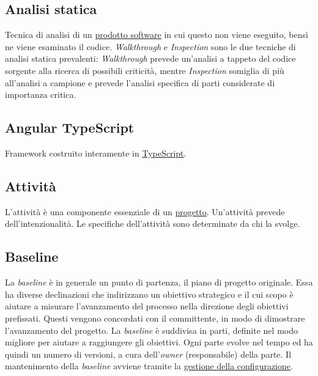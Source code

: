 	\subsection{Analisi statica}
	\label{sec:analisistatica}
	Tecnica di analisi di un \underline{\hyperref[sec:prodottosoftware]{prodotto software}} in cui questo non viene eseguito, bensì ne viene esaminato il codice.
	\emph{Walkthrough} e \emph{Inspection} sono le due tecniche di analisi statica prevalenti: \emph{Walkthrough} prevede un'analisi a tappeto del codice sorgente alla ricerca di possibili criticità, mentre \emph{Inspection} somiglia di più all'analisi a campione e prevede l'analisi specifica di parti considerate di importanza critica.
	
	
	\subsection{Angular TypeScript}
	\label{sec:angulartypescript}
	Framework costruito interamente in \underline{\hyperref[sec:typescript]{TypeScript}}.
	
	\subsection{Attività}
	\label{sec:attivita}
	L'attività è una componente essenziale di un \underline{\hyperref[sec:progetto]{progetto}}. Un'attività prevede dell'intenzionalità. Le specifiche dell'attività sono determinate da chi la svolge.

	\newpage
	
	\subsection{Baseline}
	\label{sec:baseline}
	La \emph{baseline} è in generale un punto di partenza, il piano di progetto originale. Essa ha diverse declinazioni che indirizzano un obiettivo strategico e il cui scopo è aiutare a misurare l'avanzamento del processo nella direzione degli obiettivi prefissati. Questi vengono concordati con il committente, in modo di dimostrare l'avanzamento del progetto. La  \emph{baseline} è suddivisa in parti, definite nel modo migliore per aiutare a raggiungere gli obiettivi. Ogni parte evolve nel tempo ed ha quindi un numero di versioni, a cura dell'\emph{owner} (responsabile) della parte. Il mantenimento della  \emph{baseline} avviene tramite la \underline{\hyperref[sec:controlloconfigurazione]{gestione della configurazione}}.

